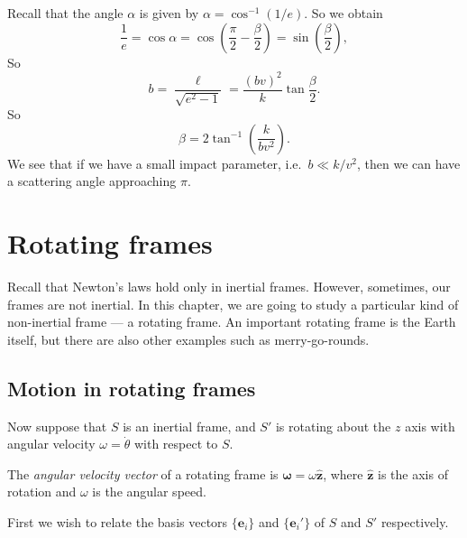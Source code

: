 \documentclass[a4paper]{article}
\begin{document}
Recall that the angle $\alpha$ is given by $\alpha = \cos^{-1} (1/e)$. So we obtain
\[
  \frac{1}{e} = \cos \alpha = \cos \left(\frac{\pi}{2} - \frac{\beta}{2}\right) = \sin\left(\frac{\beta}{2}\right),
\]
So
\[
  b = \frac{\ell}{\sqrt{e^2 - 1}} = \frac{(bv)^2}{k}\tan \frac{\beta}{2}.
\]
So
\[
  \beta = 2\tan^{-1}\left(\frac{k}{bv^2}\right).
\]
We see that if we have a small impact parameter, i.e.\ $b \ll k/v^2$, then we can have a scattering angle approaching $\pi$.

\section{Rotating frames}
Recall that Newton's laws hold only in inertial frames. However, sometimes, our frames are not inertial. In this chapter, we are going to study a particular kind of non-inertial frame --- a rotating frame. An important rotating frame is the Earth itself, but there are also other examples such as merry-go-rounds.

\subsection{Motion in rotating frames}
Now suppose that $S$ is an inertial frame, and $S'$ is rotating about the $z$ axis with angular velocity $\omega = \dot{\theta}$ with respect to $S$.

\begin{defi}
  The \emph{angular velocity vector} of a rotating frame is $\boldsymbol\omega = \omega\hat{\mathbf{z}}$, where $\hat{\mathbf{z}}$ is the axis of rotation and $\omega$ is the angular speed.
\end{defi}

First we wish to relate the basis vectors $\{\mathbf{e}_i\}$ and $\{\mathbf{e}_i'\}$ of $S$ and $S'$ respectively.
\end{document}

